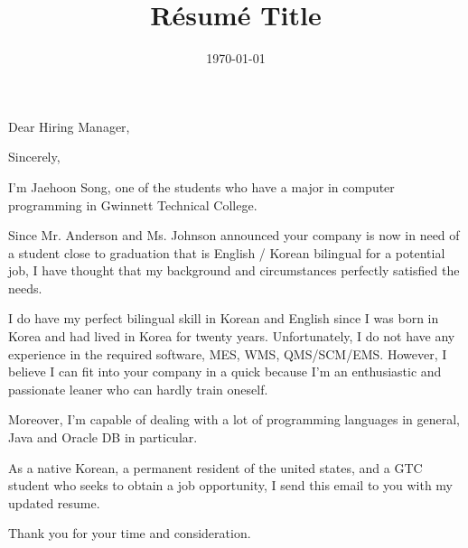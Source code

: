 \documentclass[11pt,letterpaper,roman]{moderncv}        %
\title{Résumé Title}                             %
\begin{document}
\date{\today}
\opening{Dear Hiring Manager,}
\closing{Sincerely,}



% 







\makelettertitle


I'm Jaehoon Song, one of the students who have a major in computer 
programming in Gwinnett Technical College.

Since Mr. Anderson and Ms. Johnson announced your company is now in 
need of a student close to graduation that is English / Korean 
bilingual for a potential job, I have thought that my background 
and circumstances perfectly satisfied the needs.

I do have my perfect bilingual skill in Korean and English since I 
was born in Korea and had lived in Korea for twenty years. 
Unfortunately, I do not have any experience in the required software, 
MES, WMS, QMS/SCM/EMS. However, I believe I can fit into your company 
in a quick because I'm an enthusiastic and passionate leaner who can 
hardly train oneself.

Moreover, I'm capable of dealing with a lot of programming languages 
in general, Java and Oracle DB in particular.

As a native Korean, a permanent resident of the united states, and a 
GTC student who seeks to obtain a job opportunity, I send this email 
to you with my updated resume.

Thank you for your time and consideration.



\vspace{0.5cm}

\makeletterclosing
\end{document}
